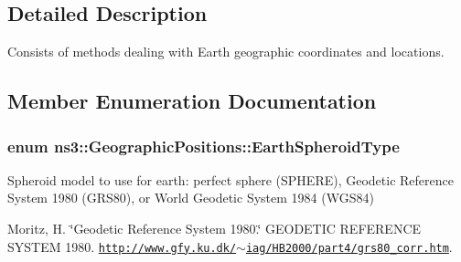 \subsection{Detailed Description}
Consists of methods dealing with Earth geographic coordinates and locations. 

\subsection{Member Enumeration Documentation}
\subsubsection[{\texorpdfstring{Earth\+Spheroid\+Type}{EarthSpheroidType}}]{\setlength{\rightskip}{0pt plus 5cm}enum {\bf ns3\+::\+Geographic\+Positions\+::\+Earth\+Spheroid\+Type}}\hypertarget{classns3_1_1GeographicPositions_a434138b76563c284972bc08a9c4a6882}{}\label{classns3_1_1GeographicPositions_a434138b76563c284972bc08a9c4a6882}
Spheroid model to use for earth\+: perfect sphere (S\+P\+H\+E\+RE), Geodetic Reference System 1980 (G\+R\+S80), or World Geodetic System 1984 (W\+G\+S84)

Moritz, H. \char`\"{}\+Geodetic Reference System 1980.\char`\"{} G\+E\+O\+D\+E\+T\+IC R\+E\+F\+E\+R\+E\+N\+CE S\+Y\+S\+T\+EM 1980. \href{http://www.gfy.ku.dk/~iag/HB2000/part4/grs80_corr.htm}{\tt http\+://www.\+gfy.\+ku.\+dk/$\sim$iag/\+H\+B2000/part4/grs80\+\_\+corr.\+htm}.

